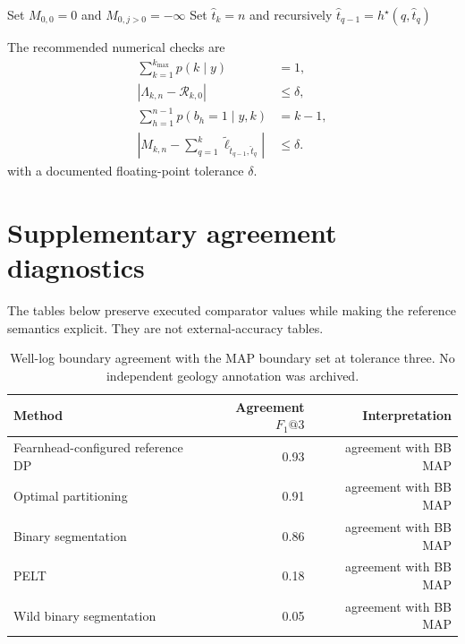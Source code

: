 \begin{algorithm}[H]
\caption{Joint-MAP max-sum and backtracking}
\label{alg:max-sum-app}
Set $M_{0,0}=0$ and $M_{0,j>0}=-\infty$\;
Set $\widehat t_k=n$ and recursively $\widehat t_{q-1}=h^\star(q,\widehat t_q)$\;
\end{algorithm}

The recommended numerical checks are
\begin{align*}
\sum_{k=1}^{k_{\max}}p(k\mid y)&=1,\\
|\Lambda_{k,n}-\mathcal R_{k,0}|&\le\delta,\\
\sum_{h=1}^{n-1}p(b_h=1\mid y,k)&=k-1,\\
\left|M_{k,n}-\sum_{q=1}^{k}
\widetilde\ell_{\widehat t_{q-1},\widehat t_q}\right|&\le\delta.
\end{align*}
with a documented floating-point tolerance $\delta$.

\section{Supplementary agreement diagnostics}
\label{app:agreement}

The tables below preserve executed comparator values while making the reference semantics explicit. They are not external-accuracy tables.

\begin{table}[H]
\centering
\small
\caption{Well-log boundary agreement with the \BayesBreak MAP boundary set at tolerance three. No independent geology annotation was archived.}
\label{tab:welllog-agreement-app}
\begin{tabular}{@{}lrr@{}}
\toprule
Method & Agreement $F_1@3$ & Interpretation \\
\midrule
Fearnhead-configured reference DP & 0.93 & agreement with BB MAP \\
Optimal partitioning & 0.91 & agreement with BB MAP \\
Binary segmentation & 0.86 & agreement with BB MAP \\
PELT & 0.18 & agreement with BB MAP \\
Wild binary segmentation & 0.05 & agreement with BB MAP \\
\bottomrule
\end{tabular}
\end{table}


